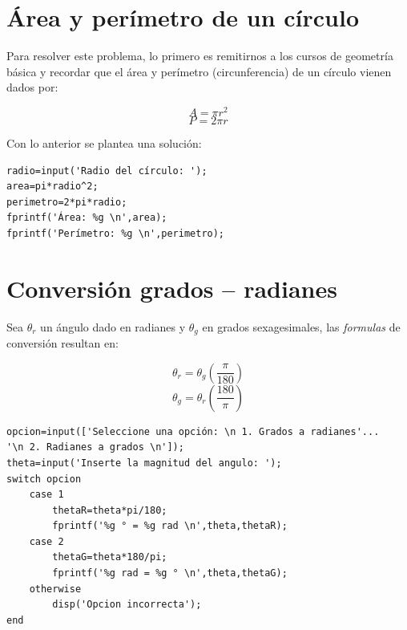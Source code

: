 
\section{Área y perímetro de un círculo}


\sol

Para resolver este problema, lo primero es remitirnos a los cursos de geometría básica y recordar 
que el área y perímetro (circunferencia) de un círculo vienen dados por:

$$A=\pi r^2$$
$$P=2 \pi r$$

Con lo anterior se plantea una solución:

\begin{verbatim}
radio=input('Radio del círculo: ');
area=pi*radio^2;
perimetro=2*pi*radio;
fprintf('Área: %g \n',area);
fprintf('Perímetro: %g \n',perimetro);
\end{verbatim}


\section{Conversión grados – radianes}


\sol

Sea $\theta_r$ un ángulo dado en radianes y $\theta_g$ en grados sexagesimales, las {\it formulas} de 
conversión resultan en:

$$\theta_r = \theta_g \left(\frac{\pi}{180}\right)$$
$$\theta_g = \theta_r \left(\frac{180}{\pi}\right)$$

\begin{verbatim}
opcion=input(['Seleccione una opción: \n 1. Grados a radianes'...
'\n 2. Radianes a grados \n']);
theta=input('Inserte la magnitud del angulo: ');
switch opcion
    case 1
        thetaR=theta*pi/180;
        fprintf('%g ° = %g rad \n',theta,thetaR);
    case 2
        thetaG=theta*180/pi;
        fprintf('%g rad = %g ° \n',theta,thetaG);
    otherwise
        disp('Opcion incorrecta');
end
\end{verbatim}


